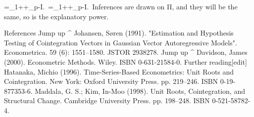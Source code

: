 {\displaystyle \Pi =\Pi _{1}+\cdots +\Pi _{p}-I.\,} \Pi =\Pi _{{1}}+\cdots +\Pi _{{p}}-I.\,
Inferences are drawn on Π, and they will be the same, so is the explanatory power.

References
Jump up ^ Johansen, Søren (1991). "Estimation and Hypothesis Testing of Cointegration Vectors in Gaussian Vector Autoregressive Models". Econometrica. 59 (6): 1551–1580. JSTOR 2938278.
Jump up ^ Davidson, James (2000). Econometric Methods. Wiley. ISBN 0-631-21584-0.
Further reading[edit]
Hatanaka, Michio (1996). Time-Series-Based Econometrics: Unit Roots and Cointegration. New York: Oxford University Press. pp. 219–246. ISBN 0-19-877353-6.
Maddala, G. S.; Kim, In-Moo (1998). Unit Roots, Cointegration, and Structural Change. Cambridge University Press. pp. 198–248. ISBN 0-521-58782-4.
